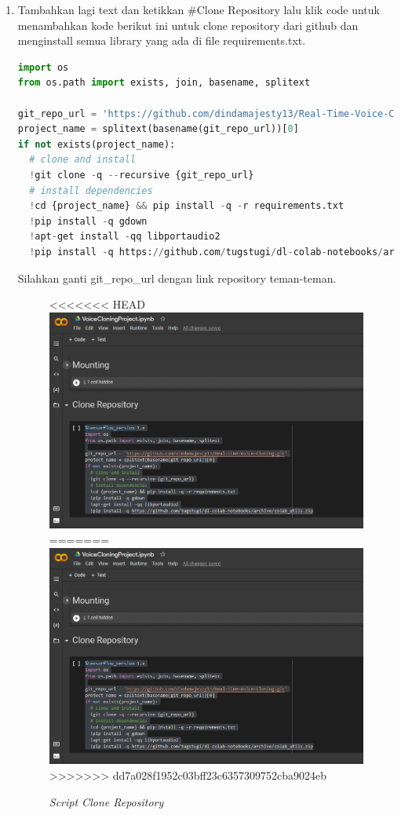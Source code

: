 \begin{enumerate}
\item Tambahkan lagi text dan ketikkan \#Clone Repository lalu klik code untuk menambahkan kode berikut ini untuk clone repository dari github dan menginstall semua library yang ada di file requirements.txt.

\begin{lstlisting}[language=Python, caption=Clone Repository]
%tensorflow_version 1.x
import os
from os.path import exists, join, basename, splitext

git_repo_url = 'https://github.com/dindamajesty13/Real-Time-Voice-Cloning.git'
project_name = splitext(basename(git_repo_url))[0]
if not exists(project_name):
  # clone and install
  !git clone -q --recursive {git_repo_url}
  # install dependencies
  !cd {project_name} && pip install -q -r requirements.txt
  !pip install -q gdown
  !apt-get install -qq libportaudio2
  !pip install -q https://github.com/tugstugi/dl-colab-notebooks/archive/colab_utils.zip
\end{lstlisting}

Silahkan ganti git\_repo\_url dengan link repository teman-teman.

\begin{figure}[H]
    \centering
<<<<<<< HEAD
    \includegraphics[scale=0.3]{figures/colab5}
=======
    \includegraphics[scale=0.45]{figures/colab5}
>>>>>>> dd7a028f1952c03bff23c6357309752cba9024eb
    \caption{\textit{Script Clone Repository}}
    \label{colab5}
\end{figure}


\end{enumerate}

